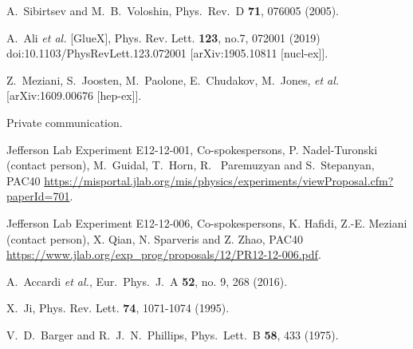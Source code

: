 \documentclass[prd,amsmath,%
twocolumn,floatfix,amssymb, preprintnumbers, nofootinbib, superscriptaddress]{revtex4}
\begin{document}
\begin{thebibliography}{99}
  A.~Sibirtsev and M.~B.~Voloshin,
  Phys.\ Rev.\ D {\bf 71}, 076005 (2005).


A.~Ali \textit{et al.} [GlueX],
Phys. Rev. Lett. \textbf{123}, no.7, 072001 (2019)
doi:10.1103/PhysRevLett.123.072001
[arXiv:1905.10811 [nucl-ex]].

Z.~Meziani, S.~Joosten, M.~Paolone, E.~Chudakov, M.~Jones, {\it et al.}
[arXiv:1609.00676 [hep-ex]].

Private communication.

Jefferson Lab Experiment E12-12-001, Co-spokespersons, P. Nadel-Turonski (contact person),  M.~Guidal, T.~Horn, R. ~Paremuzyan and S.~Stepanyan, PAC40 \url{https://misportal.jlab.org/mis/physics/experiments/viewProposal.cfm?paperId=701}.

Jefferson Lab Experiment E12-12-006, Co-spokespersons, K. Hafidi, Z.-E. Meziani (contact person), X. Qian, N. Sparveris and Z. Zhao, PAC40 \url{https://www.jlab.org/exp_prog/proposals/12/PR12-12-006.pdf}.

  A.~Accardi {\it et al.},
  Eur.\ Phys.\ J.\ A {\bf 52}, no. 9, 268 (2016).

X.~Ji,
Phys. Rev. Lett. \textbf{74}, 1071-1074 (1995). 

  

  V.~D.~Barger and R.~J.~N.~Phillips,
  Phys.\ Lett.\ B {\bf 58}, 433 (1975).
  


\end{thebibliography}
\end{document}
